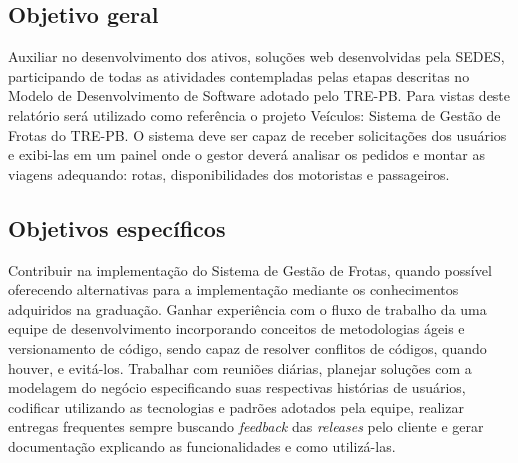 \subsection{Objetivo geral}
\label{sec:objetivoGeral}
Auxiliar no desenvolvimento dos ativos, soluções web desenvolvidas pela SEDES, participando de todas as atividades contempladas pelas etapas descritas no Modelo de Desenvolvimento de Software adotado pelo TRE-PB.  Para vistas deste relatório será utilizado como referência o projeto Veículos: Sistema de Gestão de Frotas do TRE-PB. O sistema deve ser capaz de receber solicitações dos usuários e exibi-las em um painel onde o gestor deverá analisar os pedidos e montar as viagens adequando: rotas, disponibilidades dos motoristas e passageiros.

\subsection{Objetivos específicos}
\label{sec:objetivosEspecificos}
Contribuir na implementação do Sistema de Gestão de Frotas, quando possível oferecendo alternativas para a implementação mediante os conhecimentos adquiridos na graduação. Ganhar experiência com o fluxo de trabalho da uma equipe de desenvolvimento incorporando conceitos de metodologias ágeis e versionamento de código, sendo capaz de resolver conflitos de códigos, quando houver, e evitá-los. Trabalhar com reuniões diárias, planejar soluções com a modelagem do negócio especificando suas respectivas histórias de usuários, codificar utilizando as tecnologias e padrões adotados pela equipe, realizar entregas frequentes sempre buscando \textit{feedback} das \textit{releases} pelo cliente e gerar documentação explicando as funcionalidades e como utilizá-las. 


